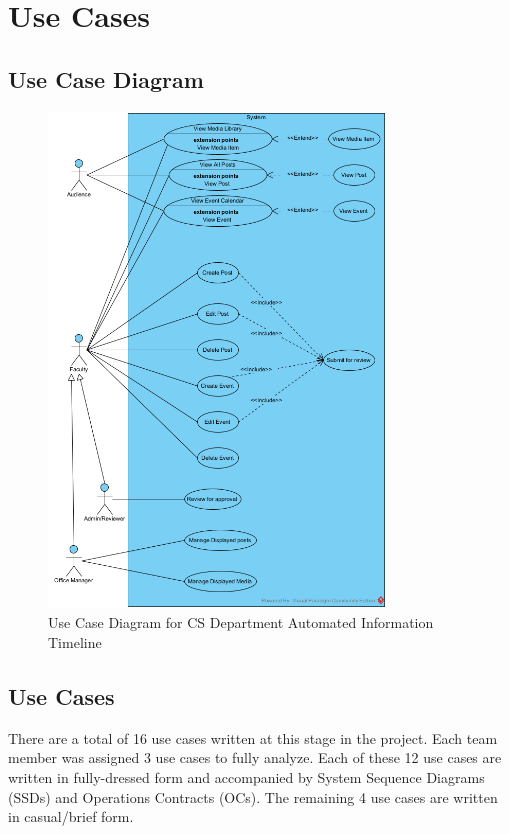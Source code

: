 \documentclass{article}
\begin{document}
\section{Use Cases}
\subsection{Use Case Diagram}
\begin{figure}[H]
    \centering
    \includegraphics[width=0.8\textwidth]{images/UCD.png}
    \centering
    \caption{Use Case Diagram for CS Department Automated Information Timeline}
\end{figure}
\subsection{Use Cases}
There are a total of 16 use cases written at this stage in the project. Each team member was assigned 3 use cases to fully analyze. Each of these 12 use cases are written in fully-dressed form and accompanied by System Sequence Diagrams (SSDs) and Operations Contracts (OCs). The remaining 4 use cases are written in casual/brief form.
\end{document}

